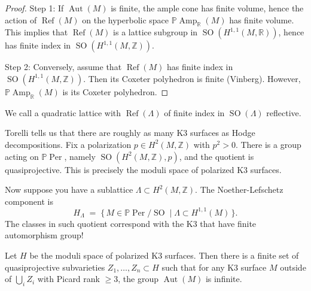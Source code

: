\begin{proof}
Step 1: If $\operatorname{Aut}(M)$ is finite, the
ample cone has finite volume, hence the action of
$\operatorname{Ref}(M)$ on the hyperbolic space
$\mathbb{P}\operatorname{Amp}_{\mathbb{R}}(M)$ has
finite volume. This implies that $\operatorname{Ref}(M)$
is a lattice subgroup in
$\operatorname{SO}(H^{1,1}(M,\mathbb{R}))$, hence has
finite index in $\operatorname{SO}(H^{1,1}(M,\mathbb{Z}))$.

Step 2: Conversely, assume that $\operatorname{Ref}(M)$
has finite index in $\operatorname{SO}(H^{1,1}(M,\mathbb{Z}))$.
Then its Coxeter polyhedron is finite (Vinberg).
However, $\mathbb{P}\operatorname{Amp}_{\mathbb{R}}(M)$
is its Coxeter polyhedron.
\end{proof}

\begin{definition}
\label{definition-reflective}
We call a quadratic lattice with
$\operatorname{Ref}(\Lambda)$ of finite index in
$\operatorname{SO}(\Lambda)$ reflective.
\end{definition}

\noindent
Torelli tells us that there are roughly as many
K3 surfaces as Hodge decompositions. Fix a
polarization $p \in H^2(M,\mathbb{Z})$ with
$p^2>0$. There is a group acting on
$\mathbb{P}\operatorname{Per}$, namely
$\operatorname{SO}(H^2(M,\mathbb{Z}),p)$, and the
quotient is quasiprojective. This is precisely the
moduli space of polarized K3 surfaces.

\noindent
Now suppose you have a sublattice
$\Lambda \subset H^2(M,\mathbb{Z})$. The
Noether-Lefschetz component is
\[
H_{\Lambda}
\;=\;
\{\,M \in \mathbb{P}\operatorname{Per}/\operatorname{SO}
\mid \Lambda \subset H^{1,1}(M)\,\}.
\]
The classes in such quotient correspond
with the K3 that have finite automorphism
group!

\begin{lemma}
\label{lemma-noether-lefschetz-components}
Let $H$ be the moduli space of polarized K3
surfaces. Then there is a finite set of
quasiprojective subvarieties
$Z_1,\dots,Z_n \subset H$ such that for any K3
surface $M$ outside of $\bigcup_i Z_i$ with Picard
rank $\geq 3$, the group $\operatorname{Aut}(M)$ is
infinite.
\end{lemma}


